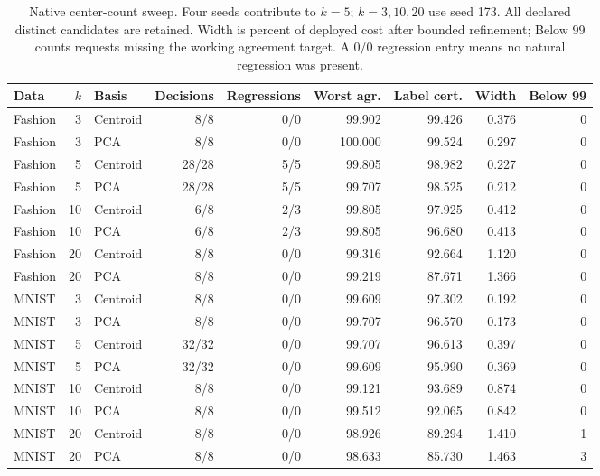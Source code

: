 \begin{table}[tbp]
\centering
\caption{Native center-count sweep. Four seeds contribute to $k=5$; $k=3,10,20$ use seed 173. All declared distinct candidates are retained. Width is percent of deployed cost after bounded refinement; Below 99 counts requests missing the working agreement target. A 0/0 regression entry means no natural regression was present.}
\label{tab:optimized-centers}
\begin{adjustbox}{max width=.98\textwidth,center=\textwidth}
\begin{tabular}{lrlrrrrrr}
\toprule
Data & $k$ & Basis & Decisions & Regressions & Worst agr. & Label cert. & Width & Below 99\\
\midrule
Fashion & 3 & Centroid & 8/8 & 0/0 & 99.902 & 99.426 & 0.376 & 0\\
Fashion & 3 & PCA & 8/8 & 0/0 & 100.000 & 99.524 & 0.297 & 0\\
Fashion & 5 & Centroid & 28/28 & 5/5 & 99.805 & 98.982 & 0.227 & 0\\
Fashion & 5 & PCA & 28/28 & 5/5 & 99.707 & 98.525 & 0.212 & 0\\
Fashion & 10 & Centroid & 6/8 & 2/3 & 99.805 & 97.925 & 0.412 & 0\\
Fashion & 10 & PCA & 6/8 & 2/3 & 99.805 & 96.680 & 0.413 & 0\\
Fashion & 20 & Centroid & 8/8 & 0/0 & 99.316 & 92.664 & 1.120 & 0\\
Fashion & 20 & PCA & 8/8 & 0/0 & 99.219 & 87.671 & 1.366 & 0\\
MNIST & 3 & Centroid & 8/8 & 0/0 & 99.609 & 97.302 & 0.192 & 0\\
MNIST & 3 & PCA & 8/8 & 0/0 & 99.707 & 96.570 & 0.173 & 0\\
MNIST & 5 & Centroid & 32/32 & 0/0 & 99.707 & 96.613 & 0.397 & 0\\
MNIST & 5 & PCA & 32/32 & 0/0 & 99.609 & 95.990 & 0.369 & 0\\
MNIST & 10 & Centroid & 8/8 & 0/0 & 99.121 & 93.689 & 0.874 & 0\\
MNIST & 10 & PCA & 8/8 & 0/0 & 99.512 & 92.065 & 0.842 & 0\\
MNIST & 20 & Centroid & 8/8 & 0/0 & 98.926 & 89.294 & 1.410 & 1\\
MNIST & 20 & PCA & 8/8 & 0/0 & 98.633 & 85.730 & 1.463 & 3\\
\bottomrule
\end{tabular}
\end{adjustbox}
\end{table}
